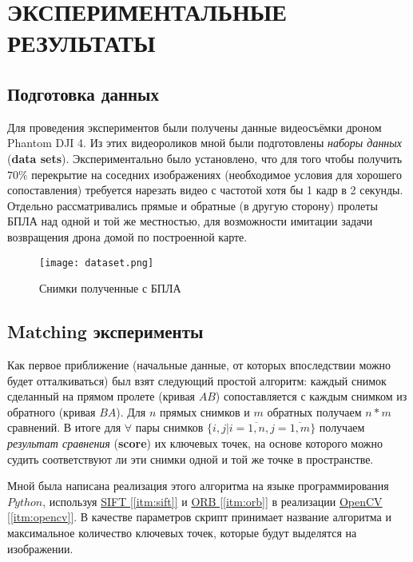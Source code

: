 \chapter{ЭКСПЕРИМЕНТАЛЬНЫЕ РЕЗУЛЬТАТЫ}

\section{Подготовка данных}

Для проведения экспериментов были получены данные видеосъёмки дроном Phantom DJI 4. Из этих видеороликов мной были подготовлены \textit{наборы данных} (\textbf{data sets}). Экспериментально было установлено, что для того чтобы получить $70\%$ перекрытие на соседних изображениях (необходимое условия для хорошего сопоставления) требуется нарезать видео с частотой хотя бы 1 кадр в 2 секунды. Отдельно рассматривались прямые и обратные (в другую сторону) пролеты БПЛА над одной и той же местностью, для возможности имитации задачи возвращения дрона домой по построенной карте.

\begin{figure}[h]
    \centering
    \texttt{[image: dataset.png]}
    \caption{Снимки полученные с БПЛА}
    \label{fig:dataset}
\end{figure}

\section{Matching эксперименты}

Как первое приближение (начальные данные, от которых впоследствии можно будет отталкиваться) был взят следующий простой алгоритм: каждый снимок сделанный на прямом пролете (кривая $AB$) сопоставляется с каждым снимком из обратного (кривая $BA$). Для $n$ прямых снимков и $m$ обратных получаем $n*m$ сравнений. В итоге для $\forall$ пары снимков $\{i, j | i=\overline{1,n}, j=\overline{1,m}\}$ получаем \textit{результат сравнения} (\textbf{score}) их ключевых точек, на основе которого можно судить соответствуют ли эти снимки одной и той же точке в пространстве.

Мной была написана реализация этого алгоритма на языке программирования $Python$, используя \hyperref[itm:sift]{SIFT [\ref{itm:sift}]} и \hyperref[itm:orb]{ORB [\ref{itm:orb}]} в реализации \hyperref[itm:opencv]{OpenCV [\ref{itm:opencv}]}. В качестве параметров скрипт принимает название алгоритма и максимальное количество ключевых точек, которые будут выделятся на изображении.

